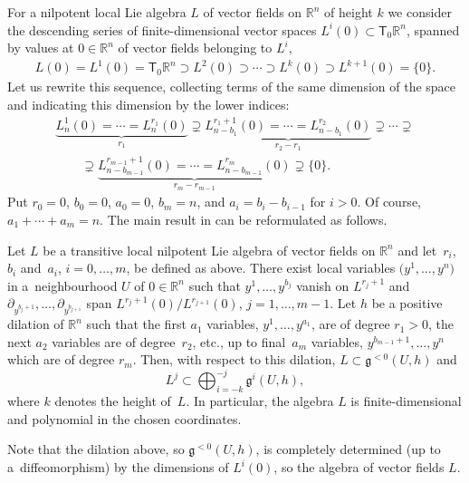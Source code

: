 For a nilpotent local Lie algebra $L$ of vector fields on ${\mathbb R}^n$ of height $k$ we consider the descending series of finite-dimensional vector spaces $L^i(0)\subset{\mathsf T}_0{\mathbb R}^n$, spanned by values at $0\in{\mathbb R}^n$ of vector fields belonging to $L^i$,
\begin{gather*}%
L(0)=L^1(0)={\mathsf T}_0{\mathbb R}^n\supset L^2(0)\supset \cdots\supset L^{k}(0)\supset L^{k+1}(0)=\{ 0\} .
\end{gather*}
Let us rewrite this sequence, collecting terms of the same dimension of the space and indicating this dimension by the lower indices:
\begin{gather*}
 \underbrace{L^1_n(0)=\cdots= L^{r_1}_n(0)}_{r_1}\supsetneq
\underbrace{L^{r_1+1}_{n-b_1}(0)=\cdots= L^{r_2}_{n-b_1}(0)}_{r_2-r_1}\supsetneq
\cdots\supsetneq\\
\qquad{} \supsetneq\underbrace{L^{r_{m-1}+1}_{n-b_{m-1}}(0)=\cdots= L^{r_m}_{n-b_{m-1}}(0)}_{r_m-r_{m-1}}
\supsetneq \{ 0\} .
\end{gather*}
Put $r_0=0$, $b_0=0$, $a_0=0$, $b_m=n$, and $a_i=b_i-b_{i-1}$ for $i>0$. Of course, $a_1+\cdots+a_m=n$.
The main result in \cite{JG90} can be reformulated as follows.
\begin{Theorem}\label{nil}
Let $L$ be a transitive local nilpotent Lie algebra of vector fields on ${\mathbb R}^n$ and let~$r_i$,~$b_i$ and~$a_i$, $i=0,\dots,m$, be defined as above. There exist local variables $\big(y^1,\dots,y^n\big)$ in a~neighbourhood $U$ of $0\in{\mathbb R}^n$ such that $y^1,\dots, y^{b_j}$ vanish on $L^{r_j+1}$ and $\partial_{y^{b_j+1}},\dots,\partial_{y^{b_{j+1}}}$ span $L^{r_{j}+1}(0)/L^{r_{j+1}}(0)$, $j=1,\dots,m-1$. Let $h$ be a positive dilation of ${\mathbb R}^n$ such that the first $a_1$ variables, $y^1,\dots,y^{a_1}$, are of degree $r_1>0$, the next $a_2$ variables are of degree~$r_2$, etc., up to final~$a_m$ variables, $y^{b_{m-1}+1},\dots,y^n$ which are of degree $r_{m}$.
Then, with respect to this dilation, $L\subset\mathfrak{g}^{<0}(U,h)$ and
\[ L^j\subset \bigoplus_{i=-k}^{-j}\mathfrak{g}^i(U,h) ,\]
where $k$ denotes the height of~$L$.
In particular, the algebra $L$ is finite-dimensional and polynomial in the chosen coordinates.
\end{Theorem}
\begin{Remark}
Note that the dilation above, so $\mathfrak{g}^{<0}(U,h)$, is completely determined (up to a~diffeomorphism) by the dimensions of $L^i(0)$, so the algebra of vector fields $L$.
\end{Remark}
